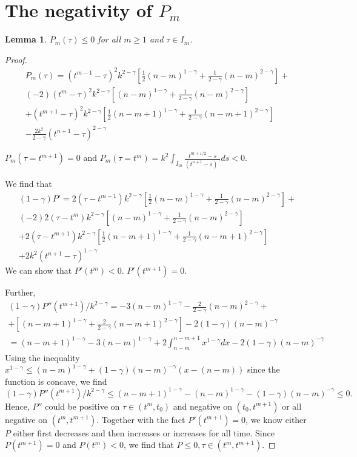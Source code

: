 \documentclass[11pt]{article} %
\newtheorem{lmm}{Lemma}
\begin{document}
\section{The negativity of $P_m$}
\begin{lmm}
$P_m(\tau)\le 0$ for all $m\ge 1$ and $\tau\in I_m$.
\end{lmm}
\begin{proof}
\begin{multline*}
P_m(\tau)=(t^{m-1}-\tau)^2k^{2-\gamma}[\frac{1}{2}(n-m)^{1-\gamma}+\frac{1}{2-\gamma}(n-m)^{2-\gamma}]+\\
(-2)(t^m-\tau)^2k^{2-\gamma}[(n-m)^{1-\gamma}+\frac{1}{2-\gamma}(n-m)^{2-\gamma}]\\
+(t^{m+1}-\tau)^2k^{2-\gamma}[\frac{1}{2}(n-m+1)^{1-\gamma}+\frac{1}{2-\gamma}(n-m+1)^{2-\gamma}]\\
-\frac{2k^2}{2-\gamma}(t^{n+1}-\tau)^{2-\gamma}
\end{multline*}

$P_m(\tau=t^{m+1})=0$ and
$P_m(\tau=t^m)=k^2\int_{I_m}\frac{t^{m+1/2}-s}{(t^{n+1}-s)^{\gamma}}ds<0$.

We find that 
\begin{multline*}
(1-\gamma)P'=2(\tau-t^{m-1})k^{2-\gamma}[\frac{1}{2}(n-m)^{1-\gamma}+\frac{1}{2-\gamma}(n-m)^{2-\gamma}]+\\
(-2)2(\tau-t^m)k^{2-\gamma}[(n-m)^{1-\gamma}+\frac{1}{2-\gamma}(n-m)^{2-\gamma}]\\
+2(\tau-t^{m+1})k^{2-\gamma}[\frac{1}{2}(n-m+1)^{1-\gamma}+\frac{1}{2-\gamma}(n-m+1)^{2-\gamma}]\\
+2k^2(t^{n+1}-\tau)^{1-\gamma}
\end{multline*}
We can show that $P'(t^m)<0$. $P'(t^{m+1})=0$. 

Further, 
\begin{multline*}
(1-\gamma)P''(t^{m+1})/k^{2-\gamma}=
-3(n-m)^{1-\gamma}-\frac{2}{2-\gamma}(n-m)^{2-\gamma}+\\
+[(n-m+1)^{1-\gamma}+\frac{2}{2-\gamma}(n-m+1)^{2-\gamma}]
-2(1-\gamma)(n-m)^{-\gamma}\\
=(n-m+1)^{1-\gamma}-3(n-m)^{1-\gamma}
+2\int_{n-m}^{n-m+1}x^{1-\gamma}dx-2(1-\gamma)(n-m)^{-\gamma}
\end{multline*}
Using the inequality $x^{1-\gamma}\le (n-m)^{1-\gamma}+(1-\gamma)(n-m)^{-\gamma}(x-(n-m))$ since the function is concave, we find $$
(1-\gamma)P''(t^{m+1})/k^{2-\gamma}\le (n-m+1)^{1-\gamma}-(n-m)^{1-\gamma}
-(1-\gamma)(n-m)^{-\gamma}\le 0.
$$
Hence, $P''$ could be positive on $\tau\in (t^m, t_0)$ and negative on $(t_0, t^{m+1})$ or all negative on $(t^m, t^{m+1})$. Together with the fact $P'(t^{m+1})=0$, we know either $P$ either first decreases and then increases or increases for all time. Since $P(t^{m+1})=0$ and $P(t^m)<0$, we find that $P\le 0,\tau\in (t^m, t^{m+1})$.
\end{proof}



\end{document}
